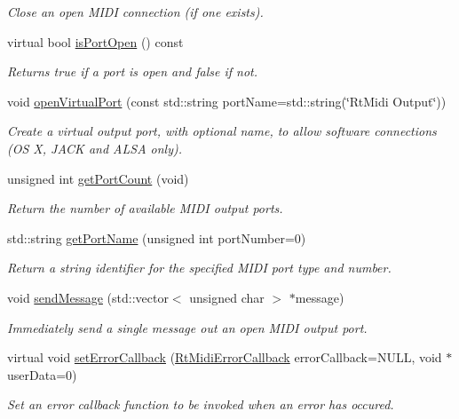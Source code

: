 \begin{DoxyCompactItemize}
\begin{DoxyCompactList}\small\item\em Close an open M\+I\+DI connection (if one exists). \end{DoxyCompactList}\item 
virtual bool \hyperlink{class_rt_midi_out_afe59ea775fb231ac19dab97bb7f5aa7d}{is\+Port\+Open} () const \hypertarget{class_rt_midi_out_afe59ea775fb231ac19dab97bb7f5aa7d}{}\label{class_rt_midi_out_afe59ea775fb231ac19dab97bb7f5aa7d}

\begin{DoxyCompactList}\small\item\em Returns true if a port is open and false if not. \end{DoxyCompactList}\item 
void \hyperlink{class_rt_midi_out_a47068e1c076d91fd89587c0ccdeddc7a}{open\+Virtual\+Port} (const std\+::string port\+Name=std\+::string(\char`\"{}Rt\+Midi Output\char`\"{}))
\begin{DoxyCompactList}\small\item\em Create a virtual output port, with optional name, to allow software connections (OS X, J\+A\+CK and A\+L\+SA only). \end{DoxyCompactList}\item 
unsigned int \hyperlink{class_rt_midi_out_a0c4d662e1c398ddf35a2dbaf66f50976}{get\+Port\+Count} (void)\hypertarget{class_rt_midi_out_a0c4d662e1c398ddf35a2dbaf66f50976}{}\label{class_rt_midi_out_a0c4d662e1c398ddf35a2dbaf66f50976}

\begin{DoxyCompactList}\small\item\em Return the number of available M\+I\+DI output ports. \end{DoxyCompactList}\item 
std\+::string \hyperlink{class_rt_midi_out_acc4ae0ab71a49ae7629075d5a9cd837c}{get\+Port\+Name} (unsigned int port\+Number=0)
\begin{DoxyCompactList}\small\item\em Return a string identifier for the specified M\+I\+DI port type and number. \end{DoxyCompactList}\item 
void \hyperlink{class_rt_midi_out_a0bd8972ef8ac4e8d37ccc4b5d51c2eb3}{send\+Message} (std\+::vector$<$ unsigned char $>$ $\ast$message)
\begin{DoxyCompactList}\small\item\em Immediately send a single message out an open M\+I\+DI output port. \end{DoxyCompactList}\item 
virtual void \hyperlink{class_rt_midi_out_a91a4571214f7b033312cc6cb661d3253}{set\+Error\+Callback} (\hyperlink{_rt_midi_8h_a57641d3490f722c3efb9ee1c640e36bb}{Rt\+Midi\+Error\+Callback} error\+Callback=N\+U\+LL, void $\ast$user\+Data=0)
\begin{DoxyCompactList}\small\item\em Set an error callback function to be invoked when an error has occured. \end{DoxyCompactList}\end{DoxyCompactItemize}
